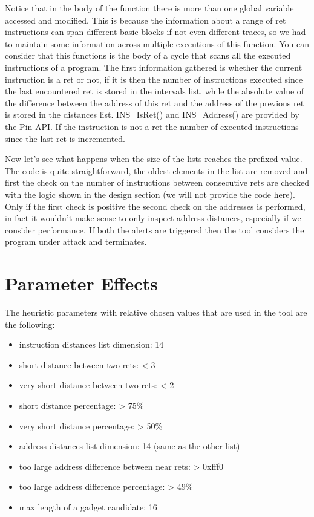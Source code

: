 \documentclass[Lau,binding=0.6cm]{sapthesis}
\begin{document}
Notice that in the body of the function there is more than one global variable accessed and modified. This is because the information about a range of ret instructions can span different basic blocks if not even different traces, so we had to maintain some information across multiple executions of this function. You can consider that this functions is the body of a cycle that scans all the executed instructions of a program. The first information gathered is whether the current instruction is a ret or not, if it is then the number of instructions executed since the last encountered ret is stored in the intervals list, while the absolute value of the difference between the address of this ret and the address of the previous ret is stored in the distances list. INS\_IsRet() and INS\_Address() are provided by the Pin API. If the instruction is not a ret the number of executed instructions since the last ret is incremented.

Now let’s see what happens when the size of the lists reaches the prefixed value. The code is quite straightforward, the oldest elements in the list are removed and first the check on the number of instructions between consecutive rets are checked with the logic shown in the design section (we will not provide the code here). Only if the first check is positive the second check on the addresses is performed, in fact it wouldn’t make sense to only inspect address distances, especially if we consider performance. If both the alerts are triggered then the tool considers the program under attack and terminates.

\section{Parameter Effects}

The heuristic parameters with relative chosen values that are used in the tool are the following:

\begin{itemize}
\item instruction distances list dimension: 14
\item short distance between two rets: < 3
\item very short distance between two rets: < 2
\item short distance percentage: > 75\%
\item very short distance percentage: > 50\%
\item address distances list dimension: 14 (same as the other list)
\item too large address difference between near rets: > 0xfff0
\item too large address difference percentage: > 49\%
\item max length of a gadget candidate: 16
\end{itemize}
\end{document}
